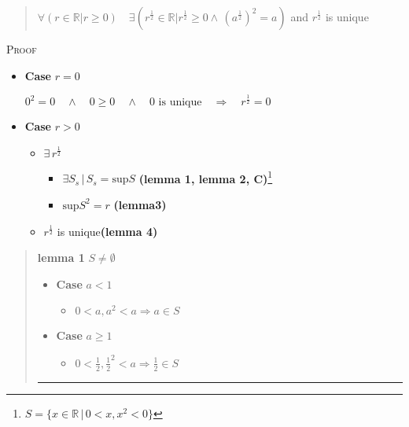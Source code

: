 \documentclass{tufte-book}
\providecommand{\tightlist}{%
  \setlength{\itemsep}{0pt}\setlength{\parskip}{0pt}}
\begin{document}
\begin{quote}
\(\forall (r \in \mathbb{R} | r \geq 0 ) \quad \exists \left( r^{\frac{1}{2}} \in \mathbb{R} | r^{\frac{1}{2}} \geq 0 \wedge\, \left(a^{\frac{1}{2}} \right)^2 = a \right)\)
and \(r^{\frac{1}{2}}\) is unique
\end{quote}

\textsc{Proof}

\begin{itemize}
\item
  \textbf{Case} \(r = 0\)

  \(0^2 = 0 \quad \wedge \quad 0 \geq 0 \quad \wedge \quad 0 \text{ is unique} \quad \Rightarrow \quad r^{\frac{1}{2}} = 0\)
\item
  \textbf{Case} \(r > 0\)

  \begin{itemize}
  \tightlist
  \item
    \(\exists\, r^{\frac{1}{2}}\)

    \begin{itemize}
    \tightlist
    \item
      \(\exists S_s \, | \, S_s = \text{sup} S\) \textbf{(lemma 1, lemma
      2, C)}\footnote{\(S = \{ x \in \mathbb{R} \, | \, 0 <x, x^2 < 0 \}\)}
    \item
      \(\text{sup}S^2 = r\) \textbf{(lemma3)}
    \end{itemize}
  \item
    \(r^{\frac{1}{2}}\) is unique\textbf{(lemma 4)}
  \end{itemize}
\end{itemize}

\begin{quote}
\textbf{lemma 1} \(S \neq \emptyset\)

\begin{itemize}
\tightlist
\item
  \textbf{Case} \(a < 1\)

  \begin{itemize}
  \tightlist
  \item
    \(0 < a , a^2 < a \Rightarrow a \in S\)\\
  \end{itemize}
\item
  \textbf{Case} \(a \geq 1\)

  \begin{itemize}
  \tightlist
  \item
    \(0 < \frac{1}{2}, \frac{1}{2}^2 < a \Rightarrow \frac{1}{2} \in S\)
  \end{itemize}
\end{itemize}

\begin{center}\rule{0.5\linewidth}{\linethickness}\end{center}
\end{quote}
\end{document}
